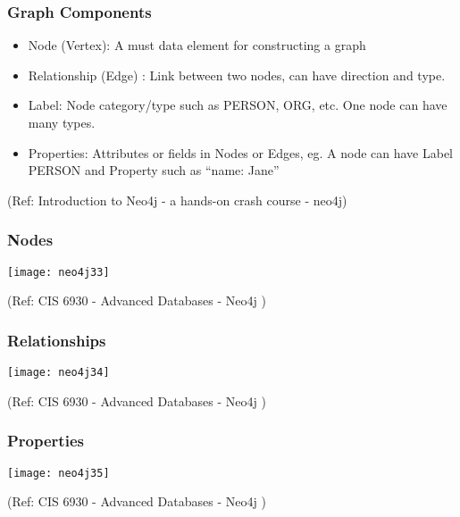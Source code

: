 \begin{frame}\frametitle{Graph Components}

\begin{itemize}
\item Node (Vertex): A must data element for constructing a graph
\item Relationship (Edge) : Link between two nodes, can have direction and type.
\item Label: Node category/type such as PERSON, ORG, etc. One node can have many types.
\item Properties: Attributes or fields in Nodes or Edges, eg. A node can have Label PERSON and Property such as ``name: Jane''
\end{itemize}



{\tiny (Ref: Introduction to Neo4j - a hands-on crash course - neo4j)}
\end{frame}


\begin{frame}\frametitle{Nodes}


\begin{center}
\texttt{[image: neo4j33]}
\end{center}	

{\tiny (Ref: CIS 6930 - Advanced Databases - Neo4j )}
\end{frame}


\begin{frame}\frametitle{Relationships}


\begin{center}
\texttt{[image: neo4j34]}
\end{center}	

{\tiny (Ref: CIS 6930 - Advanced Databases - Neo4j )}
\end{frame}

\begin{frame}\frametitle{Properties}


\begin{center}
\texttt{[image: neo4j35]}
\end{center}	

{\tiny (Ref: CIS 6930 - Advanced Databases - Neo4j )}
\end{frame}


